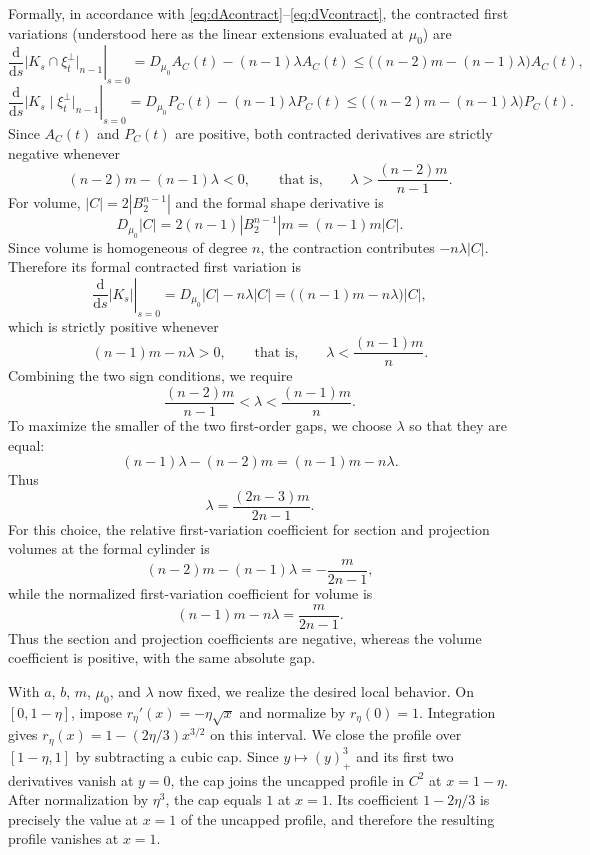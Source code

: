 \documentclass[11pt]{article}
\theoremstyle{remark}
\newcommand{\pos}[1]{(#1)_{+}}
\begin{document}
Formally, in accordance with
\eqref{eq:dAcontract}--\eqref{eq:dVcontract}, the contracted first variations
(understood here as the linear extensions evaluated at $\mu_0$) are
\begin{equation}\label{dervsec}
\left. \frac{\mathrm d}{\mathrm d s}
  \bigl|K_s\cap\xi_t^\perp\bigr|_{n-1}\right|_{s=0}
 =D_{\mu_0}A_C(t)-(n-1)\lambda A_C(t) \leq\bigl((n-2)m-(n-1)\lambda\bigr)A_C(t),
 \end{equation}
 \begin{equation}\label{dervproj}
\left.\frac{\mathrm d}{\mathrm d s}
  \bigl|K_s\mid\xi_t^\perp\bigr|_{n-1}\right|_{s=0}
 =D_{\mu_0}P_C(t)-(n-1)\lambda P_C(t)\leq\bigl((n-2)m-(n-1)\lambda\bigr)P_C(t).
\end{equation}
Since $A_C(t)$ and $P_C(t)$ are positive, both contracted derivatives are
strictly negative whenever
\[
 (n-2)m-(n-1)\lambda<0,
 \qquad\text{that is,}\qquad
 \lambda>\frac{(n-2)m}{n-1}.
\]
For volume, $|C|=2|B_2^{n-1}|$ and the formal shape derivative is
\[
 D_{\mu_0}|C|
 =2(n-1)|B_2^{n-1}|m=(n-1)m|C|.
\]
Since volume is homogeneous of degree $n$, the contraction contributes
$-n\lambda|C|$.  Therefore its formal contracted first variation is
\begin{equation}\label{dervvol}
 \left.\frac{\mathrm d}{\mathrm d s}|K_s|\right|_{s=0}
 =D_{\mu_0}|C|-n\lambda|C|=\bigl((n-1)m-n\lambda\bigr)|C|,
\end{equation}
which is strictly positive whenever
\[
 (n-1)m-n\lambda>0,
 \qquad\text{that is,}\qquad
 \lambda<\frac{(n-1)m}{n}.
\]
Combining the two sign conditions, we require
\[
 \frac{(n-2)m}{n-1}
 <
 \lambda
 <
 \frac{(n-1)m}{n}.
\]
To maximize the smaller of the two first-order gaps, we choose $\lambda$
so that they are equal:
\[
 (n-1)\lambda-(n-2)m=(n-1)m-n\lambda.
\]
Thus
\[
 \lambda=\frac{(2n-3)m}{2n-1}.
\]
For this choice, the relative first-variation coefficient for section and
projection volumes at the formal cylinder is
\begin{equation}\label{eq:data-margin}
 (n-2)m-(n-1)\lambda=-\frac{m}{2n-1},
\end{equation}
while the normalized first-variation coefficient for volume is
\begin{equation}\label{eq:volume-margin}
 (n-1)m-n\lambda=\frac{m}{2n-1}.
\end{equation}
Thus the section and projection coefficients are negative, whereas the
volume coefficient is positive, with the same absolute gap.

With $a$, $b$, $m$, $\mu_0$, and $\lambda$ now fixed, we realize the desired
local behavior.  On $[0,1-\eta]$, impose
$r_\eta'(x)=-\eta\sqrt{x}$ and normalize by
$r_\eta(0)=1$.  Integration gives
$r_\eta(x)=1-(2\eta/3)x^{3/2}$ on this interval. 
We close the profile over $[1-\eta,1]$ by subtracting a cubic cap.  Since
$y\mapsto\pos{y}^3$ and its first two derivatives vanish at $y=0$, the cap
joins the uncapped profile in $C^2$ at $x=1-\eta$.  After normalization by
$\eta^3$, the cap equals $1$ at $x=1$.  Its coefficient $1-2\eta/3$ is
precisely the value at $x=1$ of the uncapped profile, and therefore the
resulting profile vanishes at $x=1$.
\end{document}
